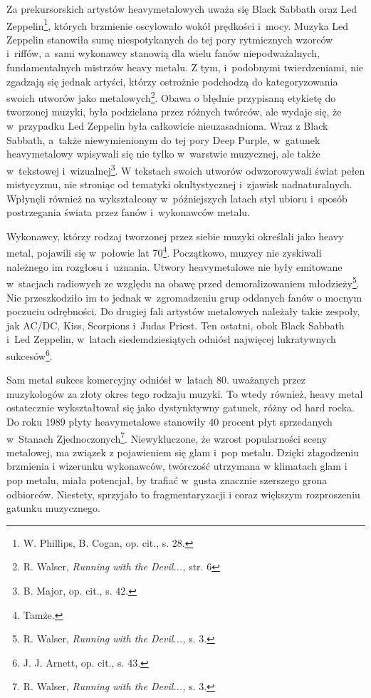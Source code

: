 \documentclass[12pt, a4paper, titlepage]{report}
\begin{document}
Za prekursorskich artystów heavymetalowych uważa się Black Sabbath oraz Led Zeppelin\footnote{W. Phillips, B. Cogan, op. cit., s. 28.}, których brzmienie oscylowało wokół prędkości i~mocy. Muzyka Led Zeppelin stanowiła sumę niespotykanych do tej pory rytmicznych wzorców i~riffów, a~sami wykonawcy stanowią dla wielu fanów niepodważalnych, fundamentalnych mistrzów heavy metalu. Z tym, i~podobnymi twierdzeniami, nie zgadzają się jednak artyści, którzy ostrożnie podchodzą do kategoryzowania swoich utworów jako metalowych\footnote{R. Walser, \textit{Running with the Devil...,} str. 6}. Obawa o błędnie przypisaną etykietę do tworzonej muzyki, była podzielana przez różnych twórców, ale wydaje się, że w~przypadku Led Zeppelin była całkowicie nieuzasadniona. Wraz z Black Sabbath, a~także niewymienionym do tej pory Deep Purple, w~gatunek heavymetalowy wpisywali się nie tylko w~warstwie muzycznej, ale także w~tekstowej i~wizualnej\footnote{B. Major, op. cit., s. 42.}. W tekstach swoich utworów odwzorowywali świat pełen mistycyzmu, nie stroniąc od tematyki okultystycznej i~zjawisk nadnaturalnych. Wpłynęli również na wykształcony w~późniejszych latach styl ubioru i~sposób postrzegania świata przez fanów i~wykonawców metalu. 

Wykonawcy, którzy rodzaj tworzonej przez siebie muzyki określali jako heavy metal, pojawili się w~połowie lat 70\footnote{Tamże.}. Początkowo, muzycy nie zyskiwali należnego im rozgłosu i~uznania. Utwory heavymetalowe nie były emitowane w~stacjach radiowych ze względu na obawę przed demoralizowaniem młodzieży\footnote{R. Walser, \textit{Running with the Devil...,} s. 3. }. Nie przeszkodziło im to jednak w~zgromadzeniu grup oddanych fanów o mocnym poczuciu odrębności. Do drugiej fali artystów metalowych należały takie zespoły, jak AC/DC, Kiss, Scorpions i~Judas Priest. Ten ostatni, obok Black Sabbath i~Led Zeppelin, w~latach siedemdziesiątych odniósł najwięcej lukratywnych sukcesów\footnote{J. J. Arnett, op. cit., s. 43.}.

Sam metal sukces komercyjny odniósł w~latach 80. uważanych przez muzykologów za złoty okres tego rodzaju muzyki. To wtedy również, heavy metal ostatecznie wykształtował się jako dystynktywny gatunek, różny od hard rocka. Do roku 1989 płyty heavymetalowe stanowiły 40 procent płyt sprzedanych w~Stanach Zjednoczonych\footnote{R. Walser, \textit{Running with the Devil...,} s. 3.}. Niewykluczone, że wzrost popularności sceny metalowej, ma związek z pojawieniem się glam i~pop metalu. Dzięki złagodzeniu brzmienia i wizerunku wykonawców, twórczość utrzymana w klimatach glam i pop metalu, miała potencjał, by trafiać w~gusta znacznie szerszego grona odbiorców. Niestety, sprzyjało to fragmentaryzacji i coraz większym rozproszeniu gatunku muzycznego.
\end{document}
